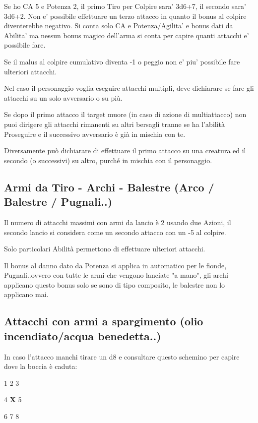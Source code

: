 \documentclass[a4paper,11pt,twoside,openany]{book}
\begin{document}
Se ho CA 5 e Potenza 2, il primo Tiro per Colpire sara' 3d6+7, il secondo sara' 3d6+2. Non e' possibile effettuare un terzo attacco in quanto il bonus al colpire diventerebbe negativo.
Si conta solo CA e Potenza/Agilita' e bonus dati da Abilita' ma nessun bonus magico dell'arma si conta per capire quanti attacchi e' possibile fare.

Se il malus al colpire cumulativo diventa -1 o peggio non e' piu' possibile fare ulteriori attacchi.

Nel caso il personaggio voglia eseguire attacchi multipli, deve dichiarare se fare gli attacchi su un solo avversario o su più.

Se dopo il primo attacco il target muore (in caso di azione di multiattacco) non puoi dirigere gli attacchi rimanenti su altri bersagli tranne se ha l'abilità Proseguire e il successivo avversario è già in mischia con te.

Diversamente può dichiarare di effettuare il primo attacco su una creatura ed il secondo (o successivi) su altro, purché in mischia con il personaggio.

\subsection{Armi da Tiro - Archi - Balestre (Arco / Balestre / Pugnali..)}

Il numero di attacchi massimi con armi da lancio è 2 usando due Azioni, il secondo lancio si considera come un secondo attacco con un -5 al colpire.

Solo particolari Abilità permettono di effettuare ulteriori attacchi.

Il bonus al danno dato da Potenza si applica in automatico per le fionde, Pugnali..ovvero con tutte le armi che vengono lanciate "a mano", gli archi applicano questo bonus solo se sono di tipo composito, le balestre non lo applicano mai.

\subsection{Attacchi con armi a spargimento (olio incendiato/acqua benedetta..)} 

In caso l'attacco manchi tirare un d8 e consultare questo schemino per capire dove la boccia è caduta:

1 2 3

4 \textbf{X} 5

6 7 8
\end{document}
